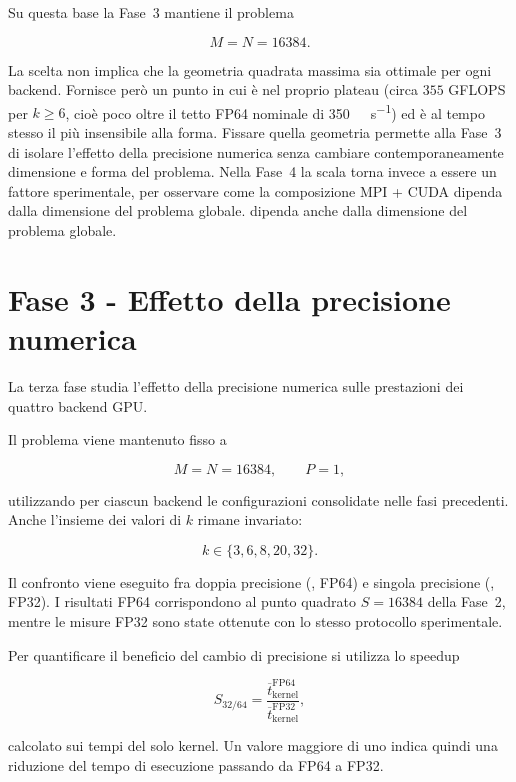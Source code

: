 \medskip

Su questa base la Fase~3 mantiene il problema

\[
M=N=\num{16384}.
\]

La scelta non implica che la geometria quadrata massima sia ottimale per ogni
backend. Fornisce però un punto in cui  è nel proprio
plateau (circa $355$ GFLOPS per $k\ge6$, cioè poco oltre il tetto FP64
nominale di \SI{350}{\giga\flop\per\second}) ed è al tempo stesso il più
insensibile alla forma. Fissare quella geometria permette alla Fase~3 di
isolare l'effetto della precisione numerica senza cambiare
contemporaneamente dimensione e forma del problema. Nella Fase~4 la scala
torna invece a essere un fattore sperimentale, per osservare come la
composizione MPI + CUDA dipenda dalla dimensione del problema globale.
dipenda anche dalla dimensione del problema globale.




\section{Fase 3 - Effetto della precisione numerica}
\label{sec:ris-fase3}
\label{sec:c7}

La terza fase studia l'effetto della precisione numerica sulle prestazioni dei
quattro backend GPU.

Il problema viene mantenuto fisso a

\[
M=N=\num{16384},
\qquad
P=1,
\]

utilizzando per ciascun backend le configurazioni consolidate nelle fasi
precedenti. Anche l'insieme dei valori di $k$ rimane invariato:

\[
k\in\{3,6,8,20,32\}.
\]

Il confronto viene eseguito fra doppia precisione (, FP64) e
singola precisione (, FP32). I risultati FP64 corrispondono al
punto quadrato $S=16384$ della Fase~2, mentre le misure FP32 sono state
ottenute con lo stesso protocollo sperimentale.

Per quantificare il beneficio del cambio di precisione si utilizza lo speedup

\begin{equation}
S_{32/64}
=
\frac{\overline{t}_{\mathrm{kernel}}^{\mathrm{FP64}}}
     {\overline{t}_{\mathrm{kernel}}^{\mathrm{FP32}}},
\label{eq:speedup-precisione}
\end{equation}

calcolato sui tempi del solo kernel. Un valore maggiore di uno indica quindi
una riduzione del tempo di esecuzione passando da FP64 a FP32.



